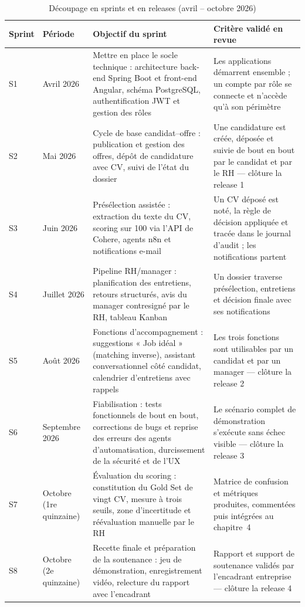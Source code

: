 \documentclass[]{./tpl/isipfe}
\begin{document}
\setcounter{table}{2}
\begin{table}[!ht]
\centering
\caption{Découpage en sprints et en releases (avril – octobre 2026)}
\label{tab_1_3}
\renewcommand{\arraystretch}{1.25}\footnotesize
\setlength{\tabcolsep}{4pt}%
\begin{tabular}{|P{0.050\textwidth}|P{0.125\textwidth}|P{0.400\textwidth}|P{0.325\textwidth}|}
\hline
\textbf{Sprint} & \textbf{Période} & \textbf{Objectif du sprint} & \textbf{Critère validé en revue} \\
\hline
S1 & Avril 2026 & Mettre en place le socle technique : architecture back-end Spring Boot et front-end Angular, schéma PostgreSQL, authentification JWT et gestion des rôles & Les applications démarrent ensemble ; un compte par rôle se connecte et n’accède qu’à son périmètre \\
\hline
S2 & Mai 2026 & Cycle de base candidat–offre : publication et gestion des offres, dépôt de candidature avec CV, suivi de l’état du dossier & Une candidature est créée, déposée et suivie de bout en bout par le candidat et par le RH — clôture la release 1 \\
\hline
S3 & Juin 2026 & Présélection assistée : extraction du texte du CV, scoring sur 100 via l’API de Cohere, agents n8n et notifications e-mail & Un CV déposé est noté, la règle de décision appliquée et tracée dans le journal d’audit ; les notifications partent \\
\hline
S4 & Juillet 2026 & Pipeline RH/manager : planification des entretiens, retours structurés, avis du manager contresigné par le RH, tableau Kanban & Un dossier traverse présélection, entretiens et décision finale avec ses notifications \\
\hline
S5 & Août 2026 & Fonctions d’accompagnement : suggestions « Job idéal » (matching inverse), assistant conversationnel côté candidat, calendrier d’entretiens avec rappels & Les trois fonctions sont utilisables par un candidat et par un manager — clôture la release 2 \\
\hline
S6 & Septembre 2026 & Fiabilisation : tests fonctionnels de bout en bout, corrections de bugs et reprise des erreurs des agents d’automatisation, durcissement de la sécurité et de l’UX & Le scénario complet de démonstration s’exécute sans échec visible — clôture la release 3 \\
\hline
S7 & Octobre (1re quinzaine) & Évaluation du scoring : constitution du Gold Set de vingt CV, mesure à trois seuils, zone d’incertitude et réévaluation manuelle par le RH & Matrice de confusion et métriques produites, commentées puis intégrées au chapitre~4 \\
\hline
S8 & Octobre (2e quinzaine) & Recette finale et préparation de la soutenance : jeu de démonstration, enregistrement vidéo, relecture du rapport avec l’encadrant & Rapport et support de soutenance validés par l’encadrant entreprise — clôture la release 4 \\
\hline
\end{tabular}
\end{table}
\end{document}
